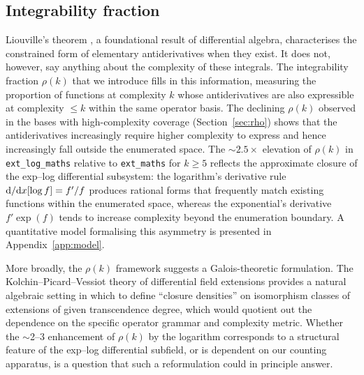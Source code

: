 \documentclass[preprint,12pt,authoryear]{elsarticle}
\newcommand{\rhok}{\rho(k)}
\newcommand{\dd}{{\rm d}}
\newcommand{\codexadd}[1]{{\color{purple}#1}}
\newcommand{\hd}[1]{{\color{red}\textbf{[HD: #1]}}}
\begin{document}
\subsection{Integrability fraction}

\codexadd{Liouville's theorem \citep{Liouville1835,Rosenlicht1972}, a foundational result of differential algebra, characterises the constrained form of elementary antiderivatives when they exist. It does not, however, say anything about the complexity of these integrals.} The integrability fraction $\rhok$ that we introduce fills in this information, measuring the proportion of functions at complexity $k$ whose antiderivatives are also expressible at complexity $\leq k$ within the same operator basis. The declining $\rhok$ observed in the bases with high-complexity coverage (Section~\ref{sec:rho}) shows that the
\codexadd{antiderivatives increasingly require higher complexity to express and hence increasingly fall outside the enumerated space. The $\sim 2.5\times$ elevation of $\rhok$ in \texttt{ext\_log\_maths} relative to \texttt{ext\_maths} for $k\geq 5$ reflects the approximate closure of the exp--log differential subsystem: the logarithm's derivative rule $\dd/\dd x[\log f] = f'/f$ produces rational forms that frequently match existing functions within the enumerated space, whereas the exponential's derivative $f'\exp(f)$ tends to increase complexity beyond the enumeration boundary. A quantitative model formalising this asymmetry is presented in Appendix~\ref{app:model}.}

More broadly, the $\rhok$ framework suggests a Galois-theoretic formulation. The Kolchin--Picard--Vessiot theory of differential field extensions \citep{Magid1994} provides a natural algebraic setting in which to define ``closure densities'' on isomorphism classes of extensions of given transcendence degree, which would quotient out the dependence on the specific operator grammar and complexity metric. Whether the $\sim$2--3 enhancement of $\rhok$ by the logarithm corresponds to a structural feature of the exp--log differential subfield, or is dependent on our counting apparatus, is a question that such a reformulation could in principle answer.
\end{document}
